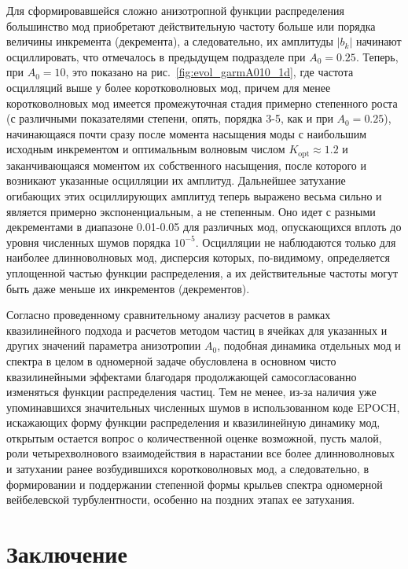 Для сформировавшейся сложно анизотропной функции распределения большинство мод приобретают действительную частоту больше или порядка величины инкремента (декремента), а следовательно, их амплитуды $|b_{k}|$ начинают осциллировать, что отмечалось в предыдущем подразделе при $A_0=0.25$. 
Теперь, при $A_0=10$, это показано на рис.~\ref{fig:evol_garmA010_1d}, где частота осцилляций выше у более коротковолновых мод, причем для менее коротковолновых мод имеется промежуточная стадия примерно степенного роста (с различными показателями степени, опять, порядка 3-5, как и при $A_0=0.25$), начинающаяся почти сразу после момента насыщения моды с наибольшим исходным инкрементом и оптимальным волновым числом $K_\mathrm{opt}\approx1.2$ и заканчивающаяся моментом их собственного насыщения, после которого и возникают указанные осцилляции их амплитуд. 
Дальнейшее затухание огибающих этих осциллирующих амплитуд теперь выражено весьма сильно и является примерно экспоненциальным, а не степенным. 
Оно идет с разными декрементами в диапазоне 0.01-0.05 для различных мод, опускающихся вплоть до уровня численных шумов порядка $10^{-5}$. 
Осцилляции не наблюдаются только для наиболее длинноволновых мод, дисперсия которых, по-видимому, определяется уплощенной частью функции распределения, а их действительные частоты могут быть даже меньше их инкрементов (декрементов).

Согласно проведенному сравнительному анализу расчетов в рамках квазилинейного подхода и расчетов методом частиц в ячейках для указанных и других значений параметра анизотропии $A_0$, подобная динамика отдельных мод и спектра в целом в одномерной задаче обусловлена в основном чисто квазилинейными эффектами благодаря продолжающей самосогласованно изменяться функции распределения частиц. 
Тем не менее, из-за наличия уже упоминавшихся значительных численных шумов в использованном коде EPOCH, искажающих форму функции распределения и квазилинейную динамику мод, открытым остается вопрос о количественной оценке возможной, пусть малой, роли четырехволнового взаимодействия в нарастании все более длинноволновых и затухании ранее возбудившихся коротковолновых мод, а следовательно, в формировании и поддержании степенной формы крыльев спектра одномерной вейбелевской турбулентности, особенно на поздних этапах ее затухания.

\section{Заключение} 

